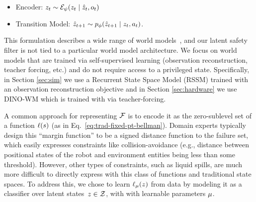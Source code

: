 \begin{itemize}
    \smallskip  
    \item[] Encoder: $z_t \sim \mathcal{E}_\psi(z_t \mid \hat{z}_t, o_t)$
    \item[] Transition Model: $\hat{z}_{t+1} \sim p_\phi(\hat{z}_{t+1} \mid z_t, a_t)$. 
    \smallskip  
\end{itemize}
This formulation describes a wide range of world models~\cite{ha2018recurrent, hafner2019learning, hafner2020dreamerv2, hafner2024masteringdiversedomainsworld,zhou2024dinowm}, and our latent safety filter is not tied to a particular world model architecture. 
We focus on world models that are trained via self-supervised learning (observation reconstruction, teacher forcing, etc.) and do not require access to a privileged state. 
Specifically, in Section \ref{sec:sim} we use a Recurrent State Space Model (RSSM) \cite{hafner2019learning} trained with an observation reconstruction objective and in Section \ref{sec:hardware} we use DINO-WM \cite{zhou2024dinowm} which is trained with via teacher-forcing.


 A common approach for representing $\mathcal{F}$ is to encode it as the zero-sublevel set of a function $\ell(s)$ (as in Eq.~\ref{eq:trad-fixed-pt-bellman}). Domain experts typically design this ``margin function'' to be a signed distance function to the failure set, which easily expresses constraints like collision-avoidance (e.g., distance between positional states of the robot and environment entities being less than some threshold). 
However, other types of constraints, such as liquid spills, are much more difficult to directly express with this class of functions and traditional state spaces. 
To address this, we chose to learn $\ell_\mu(z)$ from data by modeling it as a classifier over latent states~$z\in\mathcal{Z}$, with with learnable parameters $\mu$.

